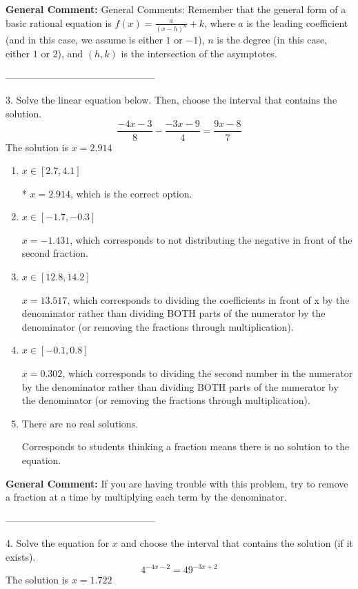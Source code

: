 \documentclass{extbook}[14pt]
\begin{document}
\textbf{General Comment:} General Comments: Remember that the general form of a basic rational equation is $ f(x) = \frac{a}{(x-h)^n} + k$, where $a$ is the leading coefficient (and in this case, we assume is either $1$ or $-1$), $n$ is the degree (in this case, either $1$ or $2$), and $(h, k)$ is the intersection of the asymptotes. 

-----------------------------------------------

3. Solve the linear equation below. Then, choose the interval that contains the solution.
\[ \frac{-4x -3}{8} - \frac{-3x -9}{4} = \frac{9x -8}{7} \] 
The solution is $ x = 2.914 $ 

\begin{enumerate}[label=\Alph*.] 
\item $ x \in [2.7, 4.1] $ 

 * $x = 2.914$, which is the correct option. 
\item $ x \in [-1.7, -0.3] $ 

  $x = -1.431$, which corresponds to not distributing the negative in front of the second fraction. 
\item $ x \in [12.8, 14.2] $ 

  $x = 13.517$, which corresponds to dividing the coefficients in front of x by the denominator rather than dividing BOTH parts of the numerator by the denominator (or removing the fractions through multiplication). 
\item $ x \in [-0.1, 0.8] $ 

  $x = 0.302$, which corresponds to dividing the second number in the numerator by the denominator rather than dividing BOTH parts of the numerator by the denominator (or removing the fractions through multiplication). 
\item $ \text{There are no real solutions.} $ 

 Corresponds to students thinking a fraction means there is no solution to the equation. 
\end{enumerate} 
 
\textbf{General Comment:} If you are having trouble with this problem, try to remove a fraction at a time by multiplying each term by the denominator. 

-----------------------------------------------

4. Solve the equation for $x$ and choose the interval that contains the solution (if it exists).
\[ 4^{-4x-2} = 49^{-3x+2} \] 
The solution is $ x = 1.722 $ 
\end{document}
